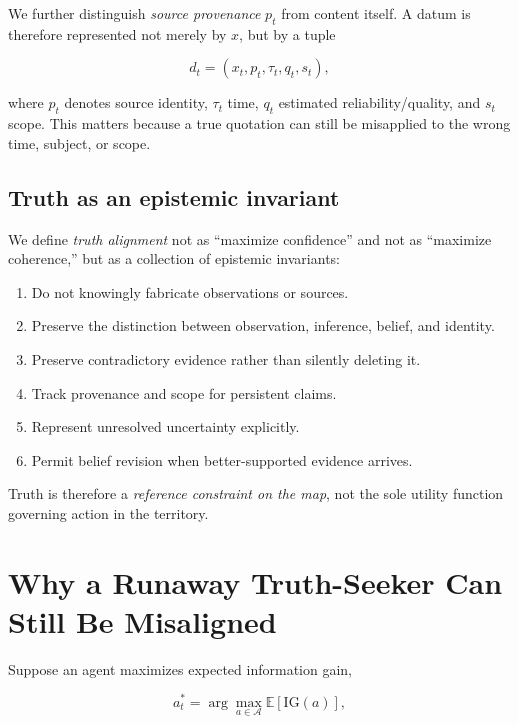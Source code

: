 \documentclass[11pt]{article}
\newcommand{\E}{\mathbb{E}}
\begin{document}
We further distinguish \emph{source provenance} $p_t$ from content itself. A datum is therefore represented not merely by $x$, but by a tuple

\begin{equation}
    d_t = (x_t, p_t, \tau_t, q_t, s_t),
\end{equation}

where $p_t$ denotes source identity, $\tau_t$ time, $q_t$ estimated reliability/quality, and $s_t$ scope. This matters because a true quotation can still be misapplied to the wrong time, subject, or scope.

\subsection{Truth as an epistemic invariant}

We define \emph{truth alignment} not as ``maximize confidence'' and not as ``maximize coherence,'' but as a collection of epistemic invariants:

\begin{enumerate}
    \item Do not knowingly fabricate observations or sources.
    \item Preserve the distinction between observation, inference, belief, and identity.
    \item Preserve contradictory evidence rather than silently deleting it.
    \item Track provenance and scope for persistent claims.
    \item Represent unresolved uncertainty explicitly.
    \item Permit belief revision when better-supported evidence arrives.
\end{enumerate}

Truth is therefore a \emph{reference constraint on the map}, not the sole utility function governing action in the territory.

\section{Why a Runaway Truth-Seeker Can Still Be Misaligned}

Suppose an agent maximizes expected information gain,

\begin{equation}
    a_t^* = \arg\max_{a \in \mathcal{A}} \E\left[\mathrm{IG}(a)\right],
\end{equation}
\end{document}
